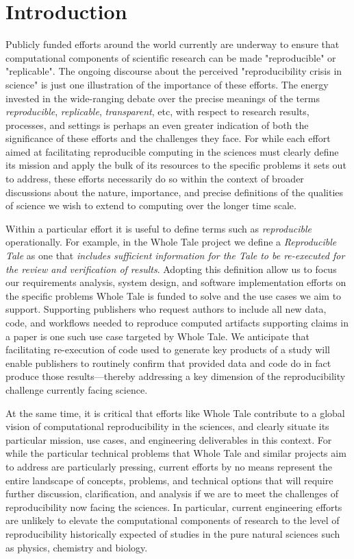 
\section{Introduction}

Publicly funded efforts around the world currently are underway to 
	ensure that computational components of scientific research
	can be made "reproducible" or "replicable".
The ongoing discourse about the perceived "reproducibility crisis in science"
	is just one illustration of the importance of these efforts.
The energy invested in the wide-ranging debate over the precise meanings of the 
	terms \emph{reproducible}, \emph{replicable}, \emph{transparent}, etc, with 
	respect to research results, processes, and settings is perhaps an even greater indication of 
	both the significance of these efforts and the challenges they face.
For while each effort aimed at facilitating reproducible computing in the
	sciences must clearly define its mission and apply the bulk of its resources
	to the specific problems it sets out to address, these efforts necessarily do
	so within the context of broader discussions about the nature, importance,
	and precise definitions of the qualities of science we wish to extend to computing
	over the longer time scale.

Within a particular effort it is useful to define terms such as \emph{reproducible} operationally.
For example, in the Whole Tale project we define a \emph{Reproducible Tale} as one 
	that \emph{includes sufficient information for the Tale to be re-executed for the review 
	and verification of results}.
Adopting this definition allow us to focus our requirements analysis, system design,
	and software implementation efforts on the specific problems Whole Tale is funded to solve
	and the use cases we aim to support.
Supporting publishers who request authors to include all new data, 
	code, and workflows needed to reproduce computed artifacts supporting
	claims in a paper is one such use case targeted by Whole Tale.
We anticipate that facilitating re-execution of code used to generate
	key products of a study will enable publishers to routinely confirm that
	provided data and code do in fact produce those results---thereby addressing
	a key dimension of the reproducibility challenge currently facing science.

At the same time, it is critical that efforts like Whole Tale contribute to a global 
	vision of computational reproducibility in the sciences, and clearly situate 
	its particular mission, use cases, and engineering deliverables in this context.
For while the particular technical problems that Whole Tale and similar projects
	aim to address are particularly pressing, current efforts by no means
	represent the entire landscape of concepts, problems, and technical options
	that will require further discussion, clarification, and analysis if we are to meet
	the challenges of reproducibility now facing the sciences.
In particular, current engineering efforts are unlikely to elevate the computational components
	of research to the level of reproducibility historically expected of studies in the
	pure natural sciences such as physics, chemistry and biology.


